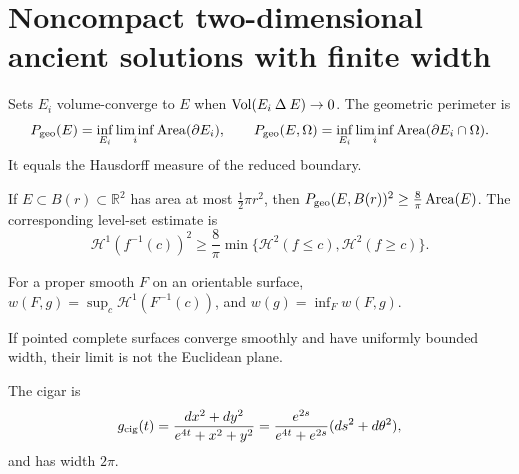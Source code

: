 \section{Noncompact two-dimensional ancient solutions with finite width}

\begin{definition}
\label{def:chow-iv-volume-perimeter}
Sets \(E_i\) volume-converge to \(E\) when \(\operatorname{Vol}(E_i\mathbin\Delta E)\to0\).
The geometric perimeter is
\[
 P_{\rm geo}(E)=\inf_{E_i}\liminf_i\operatorname{Area}(\partial E_i),\qquad
 P_{\rm geo}(E,\Omega)=\inf_{E_i}\liminf_i\operatorname{Area}(\partial E_i\cap\Omega).
\]
It equals the Hausdorff measure of the reduced boundary.
\end{definition}

\begin{theorem}
\label{thm:chow-iv-relative-isoperimetric}
If \(E\subset B(r)\subset\mathbb R^2\) has area at most \(\frac12\pi r^2\),
then \(P_{\rm geo}(E,B(r))^2\ge\frac8\pi\operatorname{Area}(E)\).  The corresponding
level-set estimate is
\[
 \mathcal H^1(f^{-1}(c))^2\ge\frac8\pi\min\{\mathcal H^2(f\le c),\mathcal H^2(f\ge c)\}.
\]
\end{theorem}

\begin{definition}[Width]
\label{def:chow-iv-width}
For a proper smooth \(F\) on an orientable surface,
\(w(F,g)=\sup_c\mathcal H^1(F^{-1}(c))\), and \(w(g)=\inf_F w(F,g)\).
\end{definition}

\begin{lemma}
\label{lem:chow-iv-width-not-euclidean}
If pointed complete surfaces converge smoothly and have uniformly bounded
width, their limit is not the Euclidean plane.
\end{lemma}

\begin{example}
\label{ex:chow-iv-cigar}
The cigar is
\[
 g_{\rm cig}(t)=\frac{dx^2+dy^2}{e^{4t}+x^2+y^2}
 =\frac{e^{2s}}{e^{4t}+e^{2s}}(ds^2+d\theta^2),
\]
and has width \(2\pi\).
\end{example}

